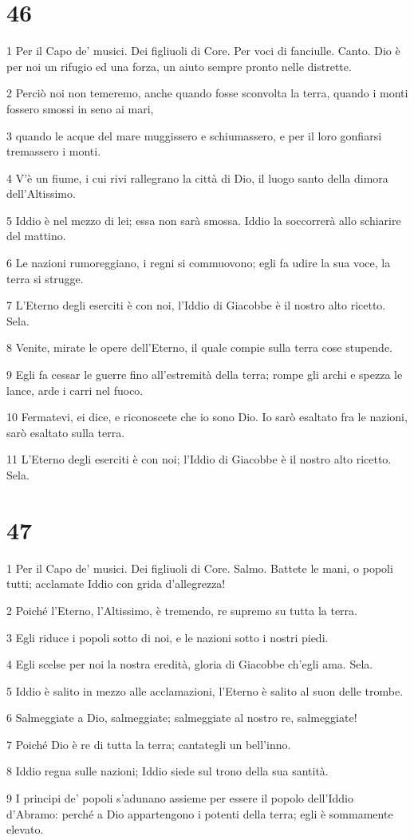 \chapter{46}

\par 1 Per il Capo de' musici. Dei figliuoli di Core. Per voci di fanciulle. Canto. Dio è per noi un rifugio ed una forza, un aiuto sempre pronto nelle distrette.
\par 2 Perciò noi non temeremo, anche quando fosse sconvolta la terra, quando i monti fossero smossi in seno ai mari,
\par 3 quando le acque del mare muggissero e schiumassero, e per il loro gonfiarsi tremassero i monti.
\par 4 V'è un fiume, i cui rivi rallegrano la città di Dio, il luogo santo della dimora dell'Altissimo.
\par 5 Iddio è nel mezzo di lei; essa non sarà smossa. Iddio la soccorrerà allo schiarire del mattino.
\par 6 Le nazioni rumoreggiano, i regni si commuovono; egli fa udire la sua voce, la terra si strugge.
\par 7 L'Eterno degli eserciti è con noi, l'Iddio di Giacobbe è il nostro alto ricetto. Sela.
\par 8 Venite, mirate le opere dell'Eterno, il quale compie sulla terra cose stupende.
\par 9 Egli fa cessar le guerre fino all'estremità della terra; rompe gli archi e spezza le lance, arde i carri nel fuoco.
\par 10 Fermatevi, ei dice, e riconoscete che io sono Dio. Io sarò esaltato fra le nazioni, sarò esaltato sulla terra.
\par 11 L'Eterno degli eserciti è con noi; l'Iddio di Giacobbe è il nostro alto ricetto. Sela.

\chapter{47}

\par 1 Per il Capo de' musici. Dei figliuoli di Core. Salmo. Battete le mani, o popoli tutti; acclamate Iddio con grida d'allegrezza!
\par 2 Poiché l'Eterno, l'Altissimo, è tremendo, re supremo su tutta la terra.
\par 3 Egli riduce i popoli sotto di noi, e le nazioni sotto i nostri piedi.
\par 4 Egli scelse per noi la nostra eredità, gloria di Giacobbe ch'egli ama. Sela.
\par 5 Iddio è salito in mezzo alle acclamazioni, l'Eterno è salito al suon delle trombe.
\par 6 Salmeggiate a Dio, salmeggiate; salmeggiate al nostro re, salmeggiate!
\par 7 Poiché Dio è re di tutta la terra; cantategli un bell'inno.
\par 8 Iddio regna sulle nazioni; Iddio siede sul trono della sua santità.
\par 9 I principi de' popoli s'adunano assieme per essere il popolo dell'Iddio d'Abramo: perché a Dio appartengono i potenti della terra; egli è sommamente elevato.

